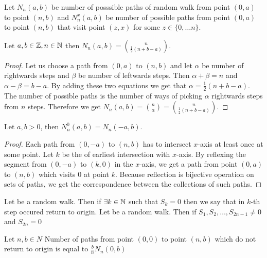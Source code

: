 \begin{defn}\label{defn-number_possible_paths}
  Let $N_n(a,b)$ be number of posssible paths of random walk \rw from point $(0,a)$ to point $(n,b)$ and $N_n^x(a,b)$ be number of possible paths from point $(0,a)$ to point $(n,b)$ that visit point $(z,x)$ for some $z \in \{0, \ldots n \}$.
\end{defn}
\begin{thm}\label{thm-number_of_possible_paths}
  Let $a,b \in \mathbb{Z}, n \in \mathbb{N}$ then $N_n(a,b)=\binom{n}{\frac{1}{2}(n+b-a)}.$
\end{thm}
\begin{proof}
  Let us choose a path from $(0,a)$ to $(n,b)$ and let $\alpha$ be number of rightwards steps and $\beta$ be number of leftwards steps. Then $\alpha+\beta=n$ and $\alpha-\beta=b-a$. By adding these two equations we get that $\alpha=\frac{1}{2}(n+b-a)$. The number of possible paths is the number of ways of picking $\alpha$ rightwards steps from $n$ steps. Therefore we get $N_n(a,b)=\binom{n}{\alpha}=\binom{n}{\frac{1}{2}(n+b-a)}.$
\end{proof}
\begin{thm}\label{thm-reflection_principle}
  Let $a,b >0$, then $N_n^0(a,b)=N_n(-a,b)$.
\end{thm}
\begin{proof}
  Each path from $(0,-a)$ to $(n,b)$ has to intersect $x$-axis at least once at some point. Let $k$ be the \Time of earliest intersection with $x$-axis. By reflexing the segment from $(0,-a)$ to $(k,0)$ in the $x$-axis, we get a path from point $(0,a)$ to $(n,b)$ which visits $0$ at point $k$. Because reflection is bijective operation on sets of paths, we get the correspondence between the collections of such paths.
\end{proof}
\begin{defn}\label{defn-return_origin}
  Let \rw be a random walk. Then if $\exists k \in \mathbb{N}$ such that $S_k=0$ then we say that in $k$-th step occured return to origin.
  Let \rw be a random walk. Then if $S_1,S_2, \ldots, S_{2n-1}\neq 0$ and $S_{2n}=0$
\end{defn}
\begin{thm}\label{thm-ballot_theorem}
  Let $n,b \in N$
  Number of paths from point $(0,0)$ to point $(n,b)$ which do not return to origin is equal to $\frac{b}{n}N_n(0,b)$
\end{thm}
